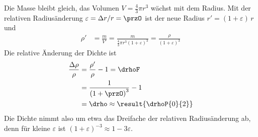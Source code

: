 Die Masse bleibt gleich, das Volumen $V = \frac{4}{3}\pi r^3$ wächst mit dem Radius. Mit der relativen Radiusänderung $\varepsilon = \Delta r/r = \przO$ ist der neue Radius $r' = (1+\varepsilon)\,r$ und
\begin{align}
 \rho' &= \frac{m}{V'} = \frac{m}{\frac{4}{3}\pi r^3\left(1+\varepsilon\right)^3} = \frac{\rho}{\left(1+\varepsilon\right)^3}
\end{align}
Die relative Änderung der Dichte ist
\begin{align}
 \frac{\Delta\rho}{\rho} &= \frac{\rho'}{\rho}-1 = \drhoF \\
   &= \frac{1}{\left(1+\przO\right)^3}-1 \\
   &= \drho \approx \result{\drhoP{0}{2}}
\end{align}
Die Dichte nimmt also um etwa das Dreifache der relativen Radiusänderung ab, denn für kleine $\varepsilon$ ist $\left(1+\varepsilon\right)^{-3} \approx 1-3\varepsilon$.
